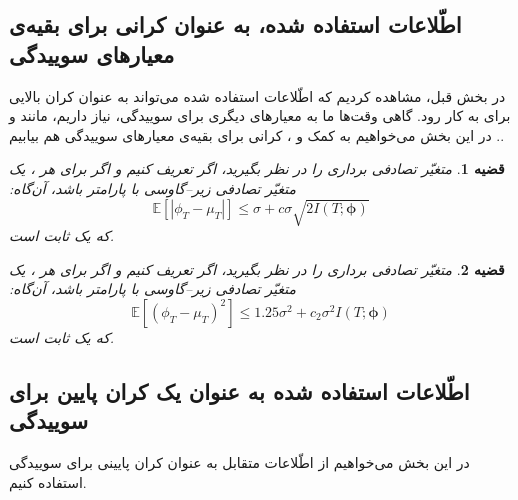 \documentclass[a4paper,12pt]{article}
\newtheorem{thm}{{\large\bf قضیه}}[section]
\newcommand{\E}{\mathbb{E}}
\newcommand{\bfphi}{\bm {\phi}}
\begin{document}
	\subsection{اطّلاعات استفاده ‌شده، به عنوان کرانی برای بقیه‌ی معیارهای سوییدگی}
	در بخش قبل، مشاهده کردیم که اطّلاعات استفاده شده می‌تواند به عنوان کران بالایی برای
	\lr{$|\E[\phi_T-\mu_T]|$}
	به کار رود. گاهی وقت‌ها ما به معیارهای دیگری برای سوییدگی، نیاز داریم، مانند
	\lr{$\E[|\phi_T-\mu_T|]$}
	و 
	\lr{$\E\left[(\phi_T-\mu_T)^2\right]$}.
	در این بخش می‌خواهیم به کمک
	\lr{$\sqrt{I(T;\bfphi)}$}
	و
	\lr{$I(T;\bfphi)$}،
	کرانی برای بقیه‌ی معیارهای سوییدگی هم بیابیم.
	\begin{thm}\label{mainthm_absbias}
		متغیّر تصادفی برداری
		\lr{$\bfphi = (\phi_1,\cdots,\phi_m)$}
		را در نظر بگیرید، اگر تعریف کنیم
		\lr{$\bm{\mu} = \E[\bm{\phi}]$}
		و اگر برای هر
		،
		یک متغیّر تصادفی زیر--گاوسی با پارامتر
		\lr{$\sigma$}
		باشد، آن‌گاه:
		\begin{equation}
		\E[|\phi_T-\mu_T|]\leq \sigma + c\sigma\sqrt{2I(T;\bm{\phi})}
		\end{equation}
		که
		یک ثابت است.
	\end{thm}
	
	\begin{thm}\label{squared_bias}
		متغیّر تصادفی برداری
		\lr{$\bfphi = (\phi_1,\cdots,\phi_m)$}
		را در نظر بگیرید، اگر تعریف کنیم
		\lr{$\bm{\mu} = \E[\bm{\phi}]$}
		و اگر برای هر
		،
		یک متغیّر تصادفی زیر--گاوسی با پارامتر
		\lr{$\sigma$}
		باشد، آن‌گاه:
		\begin{equation}
		\E\left[(\phi_T-\mu_T)^2\right]\leq 1.25\sigma^2 + c_2\sigma^2I(T;\bm{\phi})
		\end{equation}
		که
		یک ثابت است.
	\end{thm}
	
	\subsection{اطّلاعات استفاده شده به عنوان یک کران پایین برای سوییدگی}
	در این بخش می‌خواهیم از اطّلاعات متقابل به عنوان کران پایینی برای سوییدگی استفاده کنیم.
	
\end{document}
